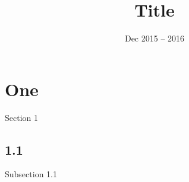 \documentclass{article}
\title{Title}
\date{Dec 2015 -- 2016}
\begin{document}

\section{One}
Section 1

\subsection{1.1}
Subsection 1.1
\end{document}
